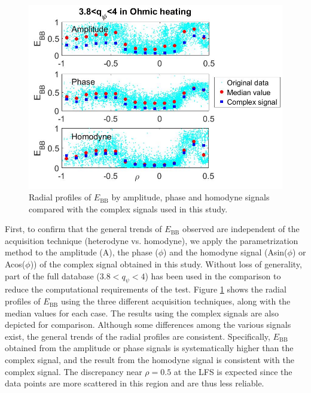 \begin{figure}[h]
\begin{centering}
\includegraphics[scale=0.5]{fig_EBB_Amp_Phase_Homo_OH.jpg}
\par\end{centering}
\caption{Radial profiles of $E_\mathrm{BB}$ by amplitude, phase and homodyne signals compared with the complex signals used in this study.}
\label{fig:EBB_Amp_Phase_Homo_OH}
\end{figure}

First, to confirm that the general trends of $E_\mathrm{BB}$ observed are independent of the acquisition technique (heterodyne vs. homodyne), we apply the parametrization method to the amplitude (A), the phase ($\phi$) and the homodyne signal (Asin($\phi$) or Acos($\phi$)) \cite{Blanco_2013_PPCF,Fernandez-Marina_2014_NF} of the complex signal obtained in this study. Without loss of generality, part of the full database ($3.8 < q_{\psi} < 4$) has been used in the comparison to reduce the computational requirements of the test. Figure \ref{fig:EBB_Amp_Phase_Homo_OH} shows the radial profiles of $E_\mathrm{BB}$ using the three different acquisition techniques, along with the median values for each case. The results using the complex signals are also depicted for comparison. Although some differences among the various signals exist, the general trends of the radial profiles are consistent. Specifically, $E_\mathrm{BB}$ obtained from the amplitude or phase signals is systematically higher than the complex signal, and the result from the homodyne signal is consistent with the complex signal. The discrepancy near $\rho = 0.5$ at the LFS is expected since the data points are more scattered in this region and are thus less reliable.


